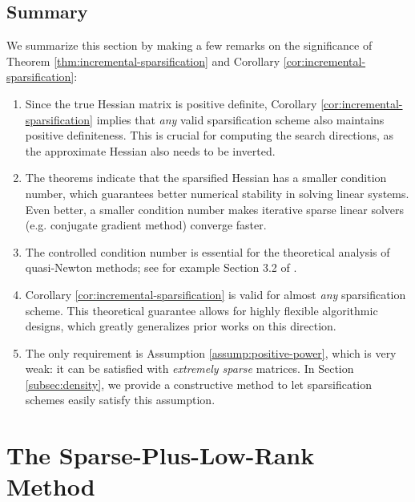 \documentclass{article}
\theoremstyle{plain}
\theoremstyle{definition}
\theoremstyle{remark}
\begin{document}
\subsection{Summary}
We summarize this section by making a few remarks on the significance of Theorem \ref{thm:incremental-sparsification} and Corollary \ref{cor:incremental-sparsification}:
\begin{enumerate}
    \item Since the true Hessian matrix is positive definite, Corollary \ref{cor:incremental-sparsification} implies that \emph{any} valid sparsification scheme also maintains positive definiteness. This is crucial for computing the search directions, as the approximate Hessian also needs to be inverted.
    \item The theorems indicate that the sparsified Hessian has a smaller condition number, which guarantees better numerical stability in solving linear systems. Even better, a smaller condition number makes iterative sparse linear solvers (e.g. conjugate gradient method) converge faster.
    \item The controlled condition number is essential for the theoretical analysis of quasi-Newton methods; see for example Section 3.2 of \citet{nocedal2006numerical}.
    \item Corollary \ref{cor:incremental-sparsification} is valid for almost \emph{any} sparsification scheme. This theoretical guarantee allows for highly flexible algorithmic designs, which greatly generalizes prior works on this direction.
    \item The only requirement is Assumption \ref{assump:positive-power}, which is very weak: it can be satisfied with \emph{extremely sparse} matrices.
    In Section \ref{subsec:density}, we provide a constructive method to let sparsification schemes easily satisfy this assumption.
\end{enumerate}


\section{The Sparse-Plus-Low-Rank Method}
\label{sec:method}
\end{document}
